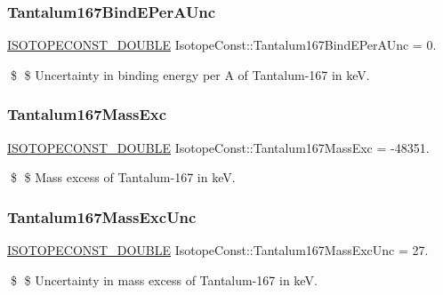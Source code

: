 \subsubsection{\texorpdfstring{Tantalum167\+Bind\+E\+Per\+A\+Unc}{Tantalum167BindEPerAUnc}}
{\footnotesize\ttfamily \mbox{\hyperlink{group___isotope_const-_macros_ga8f45a7272ce02c0b4c65c44636ed719a}{I\+S\+O\+T\+O\+P\+E\+C\+O\+N\+S\+T\+\_\+\+D\+O\+U\+B\+LE}} Isotope\+Const\+::\+Tantalum167\+Bind\+E\+Per\+A\+Unc = 0.}

\$ \$ Uncertainty in binding energy per A of Tantalum-\/167 in keV. \mbox{\label{group___isotope_const-_tantalum-_ta167_ga4ca754fa08631559c943a82d32161a11}} 
\subsubsection{\texorpdfstring{Tantalum167\+Mass\+Exc}{Tantalum167MassExc}}
{\footnotesize\ttfamily \mbox{\hyperlink{group___isotope_const-_macros_ga8f45a7272ce02c0b4c65c44636ed719a}{I\+S\+O\+T\+O\+P\+E\+C\+O\+N\+S\+T\+\_\+\+D\+O\+U\+B\+LE}} Isotope\+Const\+::\+Tantalum167\+Mass\+Exc = -\/48351.}

\$ \$ Mass excess of Tantalum-\/167 in keV. \mbox{\label{group___isotope_const-_tantalum-_ta167_gae4466100b60d0fb2e5d11fcaafa1c0bb}} 
\subsubsection{\texorpdfstring{Tantalum167\+Mass\+Exc\+Unc}{Tantalum167MassExcUnc}}
{\footnotesize\ttfamily \mbox{\hyperlink{group___isotope_const-_macros_ga8f45a7272ce02c0b4c65c44636ed719a}{I\+S\+O\+T\+O\+P\+E\+C\+O\+N\+S\+T\+\_\+\+D\+O\+U\+B\+LE}} Isotope\+Const\+::\+Tantalum167\+Mass\+Exc\+Unc = 27.}

\$ \$ Uncertainty in mass excess of Tantalum-\/167 in keV. \mbox{\label{group___isotope_const-_tantalum-_ta167_ga48fc7f94092b81a5d5b3b6fbd3bdb726}} 
